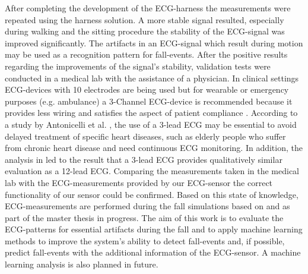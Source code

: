 \documentclass[review]{elsarticle}
\begin{document}
After completing the development of the ECG-harness the measurements were repeated using the harness solution. A more stable signal resulted, especially during walking and the sitting procedure the stability of the ECG-signal was improved significantly. The artifacts in an ECG-signal which result during motion may be used as a recognition pattern for fall-events. After the positive results regarding the improvements of the signal's stability, validation tests were conducted in a medical lab with the assistance of a physician. In clinical settings ECG-devices with 10 electrodes are being used but for wearable or emergency purposes (e.g. ambulance) a 3-Channel ECG-device is recommended because it provides less wiring and satisfies the aspect of patient compliance \cite{DrNicoletteWagner}. According to a study by Antonicelli et al. \cite{Antonicelli-ECG}, the use of a 3-lead ECG may be essential to avoid delayed treatment of specific heart diseases, such as elderly people who suffer from chronic heart disease and need continuous ECG monitoring. In addition, the analysis in \cite{Antonicelli-ECG} led to the result that a 3-lead ECG provides qualitatively similar evaluation as a 12-lead ECG. Comparing the measurements taken in the medical lab with the ECG-measurements provided by our ECG-sensor the correct functionality of our sensor could be confirmed. Based on this state of knowledge, ECG-measurements are performed during the fall simulations based on \cite{Li2009} and \cite{Pannurat2014} as part of the master thesis \cite{FatimaMasterThesis} in progress. The aim of this work is to evaluate the ECG-patterns for essential artifacts during the fall and to apply machine learning methods to improve the system's ability to detect fall-events and, if possible, predict fall-events with the additional information of the ECG-sensor. A machine learning analysis is also planned in future.%


\end{document}
